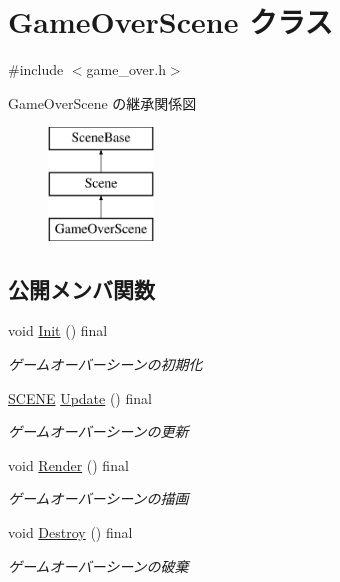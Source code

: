\hypertarget{class_game_over_scene}{}\section{Game\+Over\+Scene クラス}
\label{class_game_over_scene}


{\ttfamily \#include $<$game\+\_\+over.\+h$>$}

Game\+Over\+Scene の継承関係図\begin{figure}[H]
\begin{center}
\leavevmode
\includegraphics[height=3.000000cm]{class_game_over_scene}
\end{center}
\end{figure}
\subsection*{公開メンバ関数}
\begin{DoxyCompactItemize}
\item 
void \mbox{\hyperlink{class_game_over_scene_a7382331efb2eda768c093f66395655d7}{Init}} () final
\begin{DoxyCompactList}\small\item\em ゲームオーバーシーンの初期化 \end{DoxyCompactList}\item 
\mbox{\hyperlink{scene__base_8h_a24cee5343fb9d0706ead6e8601f363be}{S\+C\+E\+NE}} \mbox{\hyperlink{class_game_over_scene_a27d347ed1ff81cbd252e3bcc3f2989a8}{Update}} () final
\begin{DoxyCompactList}\small\item\em ゲームオーバーシーンの更新 \end{DoxyCompactList}\item 
void \mbox{\hyperlink{class_game_over_scene_a3fd3123c8660c25b01ca2f1e16615072}{Render}} () final
\begin{DoxyCompactList}\small\item\em ゲームオーバーシーンの描画 \end{DoxyCompactList}\item 
void \mbox{\hyperlink{class_game_over_scene_a439e4c515c9549abd6eb45f2a3d115fa}{Destroy}} () final
\begin{DoxyCompactList}\small\item\em ゲームオーバーシーンの破棄 \end{DoxyCompactList}\end{DoxyCompactItemize}
